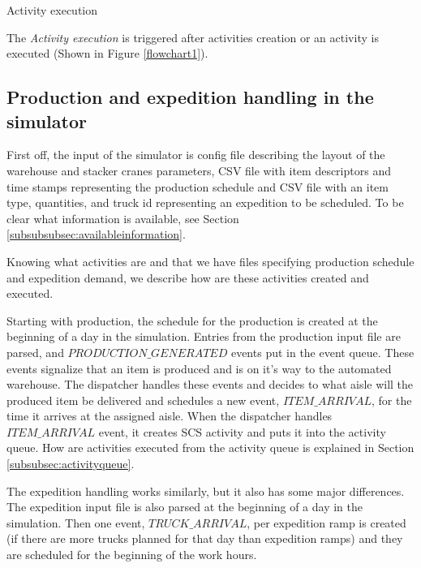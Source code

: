\documentclass{ctuthesis}
\begin{document}
\begin{algorithm}[H]
\SetAlgoLined
{
}
\caption{Activity execution}
\label{alg:activityexec}
\end{algorithm}

The \emph{Activity execution} is triggered after activities creation or an activity is executed (Shown in Figure \ref{flowchart1}).


\subsection{Production and expedition handling in the simulator}

First off, the input of the simulator is config file describing the layout of the warehouse and stacker cranes parameters, CSV file with item descriptors and time stamps representing the production schedule and CSV file with an item type, quantities, and truck id representing an expedition to be scheduled. To be clear what information is available, see Section \ref{subsubsubsec:availableinformation}.

Knowing what activities are and that we have files specifying production schedule and expedition demand, we describe how are these activities created and executed.

Starting with production, the schedule for the production is created at the beginning of a day in the simulation. Entries from the production input file are parsed, and $PRODUCTION\_GENERATED$ events put in the event queue. These events signalize that an item is produced and is on it's way to the automated warehouse. The dispatcher handles these events and decides to what aisle will the produced item be delivered and schedules a new event, $ITEM\_ARRIVAL$, for the time it arrives at the assigned aisle. When the dispatcher handles $ITEM\_ARRIVAL$ event, it creates SCS activity and puts it into the activity queue. How are activities executed from the activity queue is explained in Section \ref{subsubsec:activityqueue}.

The expedition handling works similarly, but it also has some major differences. The expedition input file is also parsed at the beginning of a day in the simulation. Then one event, $TRUCK\_ARRIVAL$, per expedition ramp is created (if there are more trucks planned for that day than expedition ramps) and they are scheduled for the beginning of the work hours. 
\end{document}

